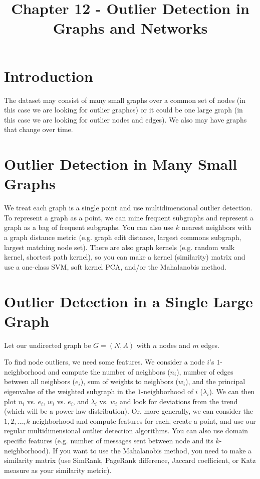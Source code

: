 \documentclass[a4paper]{article}
\title{Chapter 12 - Outlier Detection in Graphs and Networks}
\date{}
\begin{document}
\maketitle

\section{Introduction}
The dataset may consist of many small graphs over a common set of nodes (in this
case we are looking for outlier graphcs) or it could be one large graph (in this
case we are looking for outlier nodes and edges). We also may have graphs that
change over time.

\section{Outlier Detection in Many Small Graphs}
We treat each graph is a single point and use multidimensional outlier
detection. To represent a graph as a point, we can mine frequent subgraphs
and represent a graph as a bag of frequent subgraphs. You can also use $k$
nearest neighbors with a graph distance metric (e.g. graph edit distance,
largest commons subgraph, largest matching node set). There are also graph
kernels (e.g. random walk kernel, shortest path kernel), so you can make a
kernel (similarity) matrix and use a one-class SVM, soft kernel PCA, and/or
the Mahalanobis method.

\section{Outlier Detection in a Single Large Graph}
Let our undirected graph be $G = (N, A)$ with $n$ nodes and $m$ edges.

To find node outliers, we need some features. We consider a node $i$'s
$1$-neighborhood and compute the number of neighbors ($n_i$), number of edges
between all neighbors ($e_i$), sum of weights to neighbors ($w_i$), and the
principal eigenvalue of the weighted subgraph in the $1$-neighborhood of $i$
($\lambda_i$). We can then plot $n_i$ vs. $e_i$, $w_i$ vs. $e_i$, and
$\lambda_i$ vs. $w_i$ and look for deviations from the trend (which will be
a power law distribution). Or, more generally, we can consider the
$1, 2, ..., k$-neighborhood and compute features for each, create a point,
and use our regular multidimensional outlier detection algorithms. You can also
use domain specific features (e.g. number of messages sent between node and its
$k$-neighborhood). If you want to use the Mahalanobis method, you need to make
a similarity matrix (use SimRank, PageRank difference, Jaccard coefficient,
or Katz measure as your similarity metric).
\end{document}
